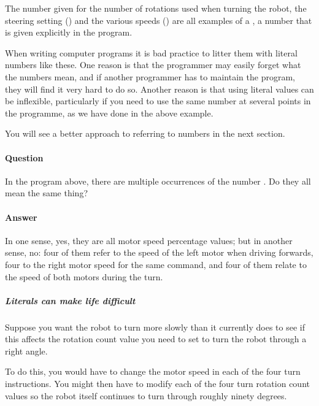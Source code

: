 \documentclass[letterpaper,10pt,english]{sphinxmanual}
\begin{document}
The number  given for the number of rotations used when turning the robot, the steering setting () and the various speeds () are all examples of a , a number that is given explicitly in the program.

When writing computer programs it is bad practice to litter them with literal numbers like these. One reason is that the programmer may easily forget what the numbers mean, and if another programmer has to maintain the program, they will find it very hard to do so. Another reason is that using literal values can be inflexible, particularly if you need to use the same number at several points in the programme, as we have done in the above example.

You will see a better approach to referring to numbers in the next section.


\paragraph{Question}
\label{\detokenize{content/01_Robot_Lab/Section_00_02:Question}}
In the program above, there are multiple occurrences of the number . Do they all mean the same thing?


\paragraph{Answer}
\label{\detokenize{content/01_Robot_Lab/Section_00_02:Answer}}
In one sense, yes, they are all motor speed percentage values; but in another sense, no: four of them refer to the speed of the left motor when driving forwards, four to the right motor speed for the same command, and four of them relate to the speed of both motors during the turn.


\subparagraph{Literals can make life difficult}
\label{\detokenize{content/01_Robot_Lab/Section_00_02:Literals-can-make-life-difficult}}
Suppose you want the robot to turn more slowly than it currently does to see if this affects the rotation count value you need to set to turn the robot through a right angle.

To do this, you would have to change the motor speed in each of the four turn instructions. You might then have to modify each of the four turn rotation count values so the robot itself continues to turn through roughly ninety degrees.
\end{document}

